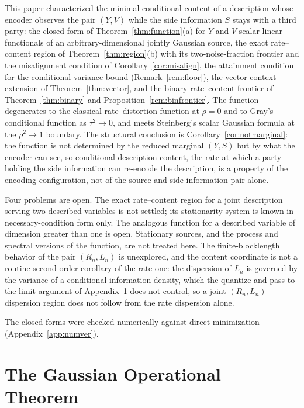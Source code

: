 \documentclass[11pt,onecolumn]{IEEEtran}
\begin{document}
This paper characterized the minimal conditional content of a description
whose encoder observes the pair $(Y,V)$ while the side information $S$
stays with a third party: the closed form of Theorem~\ref{thm:function}(a) for $Y$ and
$V$ scalar linear functionals of an arbitrary-dimensional jointly Gaussian
source, the exact rate--content region of Theorem~\ref{thm:region}(b) with
its two-noise-fraction frontier and the misalignment condition of
Corollary~\ref{cor:misalign}, the attainment condition for the conditional-variance bound
(Remark~\ref{rem:floor}), the vector-context extension of
Theorem~\ref{thm:vector}, and the binary rate--content frontier of
Theorem~\ref{thm:binary} and Proposition~\ref{rem:binfrontier}. The function degenerates to the classical
rate--distortion function at $\rho=0$ and to Gray's conditional function as
$\tau^2\to0$, and meets Steinberg's scalar Gaussian formula at the
$\rho^2\to1$ boundary. The structural conclusion is
Corollary~\ref{cor:notmarginal}: the function is not determined by the
reduced marginal $(Y,S)$ but by what the encoder can see, so conditional
description content, the rate at which a party holding the side
information can re-encode the description, is a property of the encoding
configuration, not of the source and side-information pair alone.

Four problems are open. The exact rate--content region for a joint
description serving two described variables is not settled; its stationarity
system is known in necessary-condition form only. The analogous function for
a described variable of dimension greater than one is open. Stationary
sources, and the process and spectral versions of the function, are not
treated here. The finite-blocklength behavior of the pair $(R_n,L_n)$ is
unexplored, and the content coordinate is not a routine second-order
corollary of the rate one: the dispersion of $L_n$ is governed by the
variance of a conditional information density, which the
quantize-and-pass-to-the-limit argument of Appendix~\ref{app:gaussian}
does not control, so a joint $(R_n,L_n)$ dispersion region does
not follow from the rate dispersion alone.

The closed forms were checked numerically against direct minimization
(Appendix~\ref{app:numver}).

\appendices
\section{The Gaussian Operational Theorem}
\label{app:gaussian}
\end{document}
